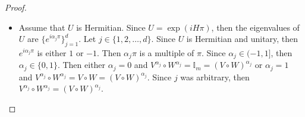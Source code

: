 \begin{proof}
\begin{itemize}
\begin{equation*}
              =
              e^{i\alpha_j\pi} Z^{\alpha_j}
          \end{equation*}
          Since $\Log( -Z ) = i \ket{0}\bra{0} \pi$ and $\Log( Z ) = i \ket{1}\bra{1} \pi$, then the following equation holds.
          \begin{align*}
            ( -Z )^{\alpha_j}
            &=
            \exp( i\alpha_j\pi \ket{0} \bra{0} )
            =
            \begin{bsmallmatrix}
                e^{i\alpha_j\pi} & 0 \\
                0 & 1
            \end{bsmallmatrix}
            &
            Z^{\alpha_j}
            &=
            \exp( i\alpha_j\pi \ket{1} \bra{1} )
            =
            \begin{bsmallmatrix}
                1 & 0 \\
                0 & e^{i\alpha_j\pi}
            \end{bsmallmatrix}
          \end{align*}
          Then the following equation also holds.
          \begin{equation*}
              1
              =
              \braket{1|1}
              =
              \bra{1} ( -Z )^{\alpha_j} \ket{1}
              =
              e^{i\alpha_j\pi} \bra{1} Z^{\alpha_j} \ket{1}
              =
              e^{i\alpha_j\pi} \left( e^{i\alpha_j\pi} \braket{1|1} \right)
              =
              e^{i\alpha_j(2\pi)}
          \end{equation*}
          Then $\alpha_j(2\pi)$ is a multiple of $2\pi$.
          Then $\alpha_j$ is an integer.
          Then $e^{i\alpha_j\pi}$ is either $-1$ or $1$.
          Since $j$ was arbitrary, then all eigenvalues of $U$ are either $-1$ or $1$.
          Since $U$ is unitary, then this means $U$ is also Hermitian.
    \item Assume that $U$ is Hermitian.
          Since $U = \exp( iH\pi )$, then the eigenvalues of $U$ are $\{ e^{i\alpha_j\pi} \}_{j=1}^{d}$.
          Let $j \in \{ 1, 2, \ldots, d \}$.
          Since $U$ is Hermitian and unitary, then $e^{i\alpha_j\pi}$ is either $1$ or $-1$.
          Then $\alpha_j\pi$ is a multiple of $\pi$.
          Since $\alpha_j \in (-1, 1]$, then $\alpha_j \in \{ 0, 1 \}$.
          Then either $\alpha_j = 0$ and $V^{\alpha_j} \circ W^{\alpha_j} = \mathbb{I}_m = ( V \circ W )^{\alpha_j}$ or $\alpha_j = 1$ and $V^{\alpha_j} \circ W^{\alpha_j} = V \circ W = ( V \circ W )^{\alpha_j}$.
          Since $j$ was arbitrary, then $V^{\alpha_j} \circ W^{\alpha_j} = ( V \circ W )^{\alpha_j}$.

\end{itemize}
\end{proof}
